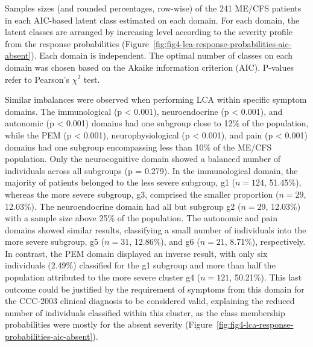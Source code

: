 \begin{table}[htbp]
    \centering
    \caption[Samples sizes of the 241 ME/CFS patients in each AIC-based latent class estimated on each domain]{Samples sizes (and rounded percentages, row-wise) of the 241 ME/CFS patients in each AIC-based latent class estimated on each domain. For each domain, the latent classes are arranged by increasing level according to the severity profile from the response probabilities (Figure~\ref{fig:fig4-lca-response-probabilities-aic-absent}). Each domain is independent. The optimal number of classes on each domain was chosen based on the Akaike information criterion (AIC). P-values refer to Pearson's $\chi^2$ test.}
    \resizebox{\linewidth}{!}{}
    \label{tab:tab1-domain-sample-sizes-aic}
\end{table}

Similar imbalances were observed when performing LCA within specific symptom domains.
The immunological (p < 0.001), neuroendocrine (p < 0.001), and autonomic (p < 0.001) domains had one subgroup close to 12\% of the population, while the PEM (p < 0.001), neurophysiological (p < 0.001), and pain (p < 0.001) domains had one subgroup encompassing less than 10\% of the ME/CFS population.
Only the neurocognitive domain showed a balanced number of individuals across all subgroups (p = 0.279).
In the immunological domain, the majority of patients belonged to the less severe subgroup, g1 ($n = 124$, 51.45\%), whereas the more severe subgroup, g3, comprised the smaller proportion ($n = 29$, 12.03\%).
The neuroendocrine domain had all but subgroup g2 ($n = 29$, 12.03\%) with a sample size above 25\% of the population.
The autonomic and pain domains showed similar results, classifying a small number of individuals into the more severe subgroup, g5 ($n = 31$, 12.86\%), and g6 ($n = 21$, 8.71\%), respectively.
In contrast, the PEM domain displayed an inverse result, with only six individuals (2.49\%) classified for the g1 subgroup and more than half the population attributed to the more severe cluster g4 ($n = 121$, 50.21\%).
This last outcome could be justified by the requirement of symptoms from this domain for the CCC-2003 clinical diagnosis to be considered valid, explaining the reduced number of individuals classified within this cluster, as the class membership probabilities were mostly for the absent severity (Figure~\ref{fig:fig4-lca-response-probabilities-aic-absent}).

